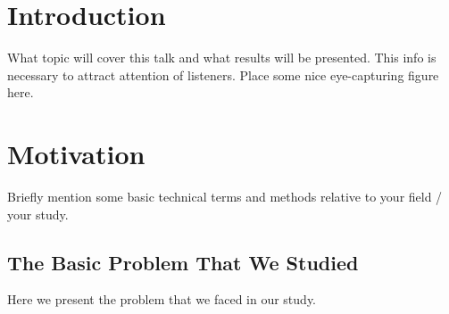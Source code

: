 



\maketitle           %
\frame{\titlepage}   %






\section*{Introduction}
  What topic will cover this talk and what results will be presented. This info is
  necessary to attract attention of listeners. Place some nice eye-capturing figure here.

\section{Motivation}
  Briefly mention some basic technical terms and methods relative to your field / your study.

\subsection{The Basic Problem That We Studied}
  Here we present the problem that we faced in our study.

